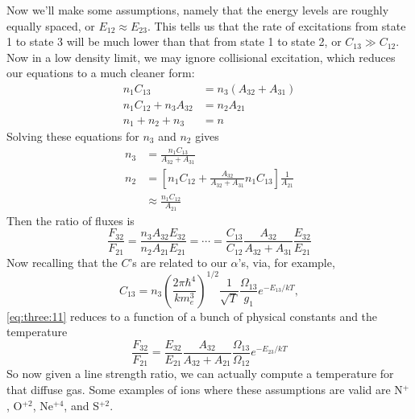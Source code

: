 \documentclass[10pt]{article}
\numberwithin{equation}{section}
\newcommand{\n}{\noindent}
\begin{document}
\n Now we'll make some assumptions, namely that the energy levels are roughly equally spaced, or $E_{12} \approx E_{23}$. This tells us that the rate of excitations from state 1 to state 3 will be much lower than that from state 1 to state 2, or $C_{13}\gg C_{12}$.
Now in a low density limit, we may ignore collisional excitation, which reduces our equations to a much cleaner form:
\begin{align}
  \label{eq:three:5} n_1 C_{13} &= n_3(A_{32}+A_{31})\\
  \label{eq:three:6} n_1 C_{12} + n_3A_{32} &= n_2A_{21}\\
  \label{eq:three:7} n_1 + n_2 + n_3 &= n
\end{align}
Solving these equations for $n_3$ and $n_2$ gives
\begin{align}
  \label{eq:three:9} n_3 &= \frac{n_1 C_{13}}{A_{32} + A_{31}}\\
  \label{eq:three:8} n_2 &= \left[n_1 C_{12} + \frac{A_{32}}{A_{32} + A_{31}} n_1 C_{13}\right]\frac{1}{A_{21}}\\
  \label{eq:three:10} &\approx \frac{n_1 C_{12}}{A_{21}}
\end{align}
Then the ratio of fluxes is 
\begin{equation}
  \label{eq:three:11} \frac{F_{32}}{F_{21}} = \frac{n_3 A_{32} E_{32}}{n_2 A_{21}E_{21}} = \cdots = \frac{C_{13}}{C_{12}} \frac{A_{32}}{A_{32} + A_{31}} \frac{E_{32}}{E_{21}}
\end{equation}
Now recalling that the $C$'s are related to our $\alpha$'s, via, for example,
\begin{equation}
  \label{eq:three:12} C_{13} = n_3 \left(\frac{2\pi \hbar^4}{k m_e^3}\right)^{1/2} \frac{1}{\sqrt{T}} \frac{\Omega_{13}}{g_1} e^{-{E_{13}}/kT},
\end{equation}
\eqref{eq:three:11} reduces to a function of a bunch of physical constants and the temperature
\begin{equation}
  \label{eq:three:13} \boxed{\frac{F_{32}}{F_{21}} = \frac{E_{32}}{E_{21}} \frac{A_{32}}{A_{32}+A_{21}} \frac{\Omega_{13}}{\Omega_{12}} e^{-E_{23}/kT}}
\end{equation}
So now given a line strength ratio, we can actually compute a temperature for that diffuse gas. Some examples of ions where these assumptions are valid are N$^+$, O$^{+2}$, Ne$^{+4}$, and S$^{+2}$.\\
\end{document}
